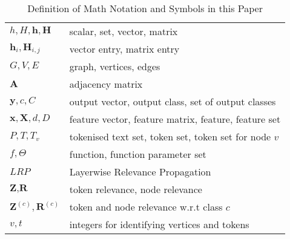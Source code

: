 \begin{table}[t]
\caption{Definition of Math Notation and Symbols in this Paper}
\centering
\begin{tabular}{|l||l|}
\hline
$h, H, \textbf{h}, \textbf{H}$ & scalar, set, vector, matrix \\
$\textbf{h}_i, \textbf{H}_{i,j}$ & vector entry, matrix entry \\
\hline
$G, V, E$ & graph, vertices, edges \\ 
$\textbf{A}$ & adjacency matrix\\
$\textbf{y}, c, C$ & output vector, output class, set of output classes \\
$\textbf{x}, \textbf{X}, d, D$ & feature vector, feature matrix, feature, feature set \\
$P, T, T_v$ & tokenised text set, token set, token set for node $v$ \\
$f, \Theta$ & function, function parameter set \\
$LRP$ & Layerwise Relevance Propagation \\
$\textbf{Z}, \textbf{R}$ & token relevance, node relevance \\
$\textbf{Z}^{(c)}, \textbf{R}^{(c)}$ & token and node relevance w.r.t class  $c$ \\
$v, t$ & integers for identifying vertices and tokens \\
\hline
\end{tabular}
\label{tab:notation}
\end{table}